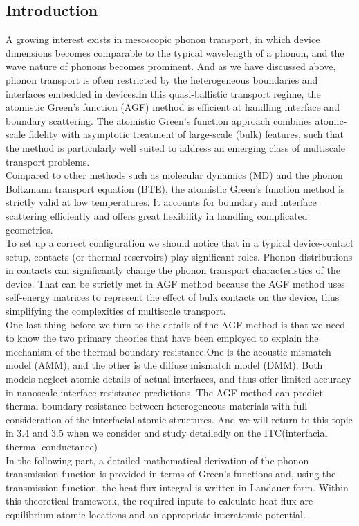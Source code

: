 \subsection{Introduction}
A growing interest exists in mesoscopic phonon transport, in which device dimensions becomes comparable to the typical wavelength of a phonon, and the wave nature of phonons becomes prominent. And as we have discussed above, phonon transport is often restricted by the heterogeneous boundaries and interfaces embedded in devices.In this quasi-ballistic transport regime, the atomistic Green’s function (AGF) method is efficient at handling interface and boundary scattering\cite{ATF}. The atomistic Green’s function approach combines atomic-scale fidelity with asymptotic treatment of large-scale (bulk) features, such that the method is particularly well suited to address an emerging class of multiscale transport problems\cite{ReviewATF}.\\
\indent Compared to other methods such as molecular dynamics (MD)\cite{MD1,MD2} and the phonon Boltzmann transport equation (BTE)\cite{BTE1,BTE2}, the atomistic Green’s function method is strictly valid at low temperatures. It accounts for boundary and interface scattering efficiently and offers great flexibility in handling complicated geometries\cite{ATF}.\\
\indent To set up a correct configuration we should notice that in a typical device-contact setup, contacts (or thermal reservoirs) play significant roles. Phonon distributions in contacts can significantly change the phonon transport characteristics of the device\cite{Angelesc}. That can be strictly met in AGF method because the AGF method uses self-energy matrices to represent the effect of bulk contacts on the device, thus simplifying the complexities of multiscale transport.\\
\indent One last thing before we turn to the details of the AGF method is that we need to know the two primary theories that have been employed to explain the mechanism of the thermal boundary resistance.One is the acoustic mismatch model (AMM)\cite{AMM}, and the other is the diffuse mismatch model (DMM)\cite{DMM}. Both models neglect atomic details of actual interfaces, and thus offer limited accuracy in nanoscale interface resistance predictions\cite{Stevens}. The AGF method can predict thermal boundary resistance between heterogeneous materials with full consideration of the interfacial atomic structures. And we will return to this topic in 3.4 and 3.5 when we consider and study detailedly on the ITC(interfacial thermal conductance)\\
\indent In the following part, a detailed mathematical
derivation of the phonon transmission function is provided in terms of Green’s functions and, using the transmission function, the heat flux integral is written in Landauer form. Within this theoretical framework, the required inputs to calculate heat flux are equilibrium atomic locations and an appropriate interatomic potential.


